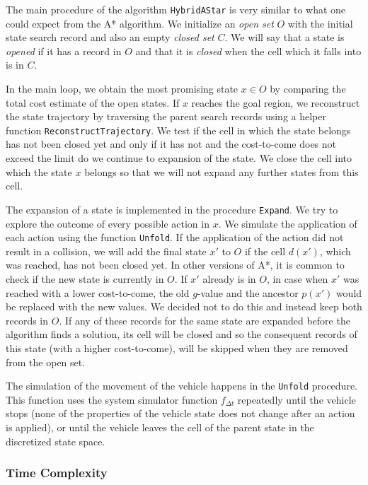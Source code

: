 The main procedure of the algorithm \texttt{HybridAStar} is very similar to what one could expect from the A* algorithm. We initialize an \textit{open set} $O$ with the initial state search record and also an empty \textit{closed set} $C$. We will say that a state is \textit{opened} if it has a record in $O$ and that it is \textit{closed} when the cell which it falls into is in $C$.

In the main loop, we obtain the most promising state $x\in O$ by comparing the total cost estimate of the open states. If $x$ reaches the goal region, we reconstruct the state trajectory by traversing the parent search records using a helper function \texttt{ReconstructTrajectory}. We test if the cell in which the state belongs has not been closed yet and only if it has not and the cost-to-come does not exceed the limit do we continue to expansion of the state. We close the cell into which the state $x$ belongs so that we will not expand any further states from this cell.

The expansion of a state is implemented in the procedure \texttt{Expand}. We try to explore the outcome of every possible action in $x$. We simulate the application of each action using the function \texttt{Unfold}. If the application of the action did not result in a collision, we will add the final state $x'$ to $O$ if the cell $d(x')$, which was reached, has not been closed yet. In other versions of A*, it is common to check if the new state is currently in $O$. If $x'$ already is in $O$, in case when $x'$ was reached with a lower cost-to-come, the old $g$-value and the ancestor $p(x')$ would be replaced with the new values. We decided not to do this and instead keep both records in $O$. If any of these records for the same state are expanded before the algorithm finds a solution, its cell will be closed and so the consequent records of this state (with a higher cost-to-come), will be skipped when they are removed from the open set.

The simulation of the movement of the vehicle happens in the \texttt{Unfold} procedure. This function uses the system simulator function $f_{\Delta t}$ repeatedly until the vehicle stops (none of the properties of the vehicle state does not change after an action is applied), or until the vehicle leaves the cell of the parent state in the discretized state space.

\subsubsection{Time Complexity}

